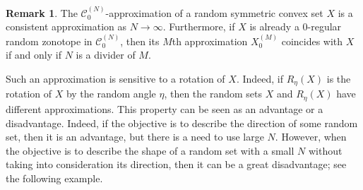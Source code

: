 \documentclass[numbers,compress,v1.0.1]{vmsta}
\theoremstyle{definition}
\newtheorem{remark}{Remark}
\begin{document}
\begin{remark}
The $\mathcal{C}^{(N)}_0$-approximation of a random symmetric convex
set $X$ is a consistent approximation as $N\rightarrow\infty$.
Furthermore, if $X$ is already a $0$-regular random zonotope in
$\mathcal{C}^{(N)}_0$, then its $M$th approximation $X^{(M)}_0$
coincides with $X$ if and only if $N$ is a divider of $M$.

Such an approximation is sensitive to a rotation of $X$. Indeed, if
$R_\eta(X)$ is the rotation of $X$ by the random angle $\eta$, then the
random sets $X$ and $R_\eta(X)$ have different approximations. This
property can be seen as an advantage or a disadvantage. Indeed, if the
objective is to describe the direction of some random set, then it is
an advantage, but there is a need to use large $N$. However, when the
objective is to describe the shape of a random set with a small $N$
without taking into consideration its direction, then it can be a great
disadvantage; see the following example.
\end{remark}
\end{document}
